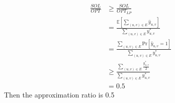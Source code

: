 \documentclass[12pt]{article}
\newenvironment{solution}[2][Solution]{\begin{trivlist}
\item[\hskip \labelsep {\bfseries #1}\hskip \labelsep {\bfseries #2.}]}{\end{trivlist}}
\begin{document}
\begin{solution}{2}
\begin{itemize}
\begin{align*}
                  \frac{SOL}{OPT} & \ge \frac{SOL}{OPT_{LP}}                                                             \\
                                  & = \frac{\mathbb{E}[\sum_{(u,v) \in E}\hat{y}_{u,v}]}{\sum_{(u,v) \in E}y_{u,v}^*}    \\
                                  & = \frac{\sum_{(u,v) \in E}\mathrm{Pr}[\hat{y}_{u,v}=1]}{\sum_{(u,v) \in E}y_{u,v}^*} \\
                                  & \ge \frac{\sum_{(u,v) \in E}\frac{y_{u,v}^*}2}{\sum_{(u,v) \in E}y_{u,v}^*}          \\
                                  & = 0.5
              \end{align*}
              Then the approximation ratio is 0.5
    \end{itemize}
\end{solution}
\end{document}
